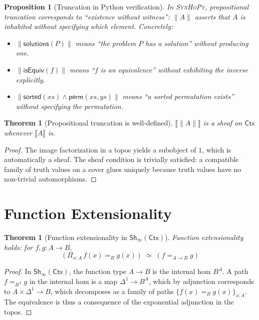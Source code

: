 \documentclass[11pt,a4paper]{report}
\theoremstyle{definition}
\theoremstyle{plain}
\newtheorem{theorem}[definition]{Theorem}
\newtheorem{proposition}[definition]{Proposition}
\newcommand{\den}[1]{\llbracket #1 \rrbracket}
\newcommand{\Ctx}{\mathsf{Ctx}}
\newcommand{\synhopy}{\textsc{SynHoPy}}
\newcommand{\Sh}{\mathsf{Sh}}
\begin{document}
\begin{proposition}[Truncation in Python verification]
In \synhopy{}, propositional truncation corresponds to ``existence without
witness'': $\|A\|$ asserts that $A$ is inhabited without specifying which
element.  Concretely:
\begin{itemize}
  \item $\|\mathsf{solutions}(P)\|$ means ``the problem $P$ has a solution''
    without producing one.
  \item $\|\mathsf{isEquiv}(f)\|$ means ``$f$ is an equivalence'' without
    exhibiting the inverse explicitly.
  \item $\|\mathsf{sorted}(xs) \wedge \mathsf{perm}(xs, ys)\|$ means ``a sorted
    permutation exists'' without specifying the permutation.
\end{itemize}
\end{proposition}

\begin{theorem}[Propositional truncation is well-defined]
$\den{\|A\|}$ is a sheaf on $\Ctx$ whenever $\den{A}$ is.
\end{theorem}
\begin{proof}
The image factorization in a topos yields a subobject of $1$, which is
automatically a sheaf.  The sheaf condition is trivially satisfied: a compatible
family of truth values on a cover glues uniquely because truth values have no
non-trivial automorphisms.
\end{proof}


\section{Function Extensionality}

\begin{theorem}[Function extensionality in $\Sh_\infty(\Ctx)$]
\label{thm:funext-model}
Function extensionality holds: for $f, g : A \to B$,
\[
  (\Pi_{x:A}\, f(x) =_B g(x)) \;\simeq\; (f =_{A \to B} g)
\]
\end{theorem}
\begin{proof}
In $\Sh_\infty(\Ctx)$, the function type $A \to B$ is the internal hom
$B^A$.  A path $f =_{B^A} g$ in the internal hom is a map
$\Delta^1 \to B^A$, which by adjunction corresponds to $A \times \Delta^1 \to B$,
which decomposes as a family of paths $\{f(x) =_B g(x)\}_{x:A}$.  The
equivalence is thus a consequence of the exponential adjunction in the topos.
\end{proof}
\end{document}
